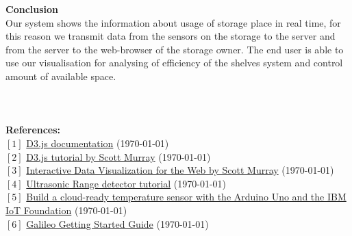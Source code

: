 \documentclass[english]{article}
\begin{document}
\textbf{Conclusion}\\
Our system shows the information about usage of storage place in real time, for this reason we transmit data from the sensors on the storage to the server and from the server to the web-browser of the storage owner. The end user is able to use our visualisation for analysing of efficiency of the shelves system and control amount of available space.
\\\\\\\\

\textbf{References:}\\
$[1]$ \href{http://d3js.org}{D3.js documentation} (\today)\\
$[2]$ \href{http://alignedleft.com/tutorials/d3}{D3.js tutorial by Scott Murray} (\today)\\
$[3]$ \href{http://shop.oreilly.com/product/0636920026938.do?cmp=af-strata-books-videos-product_cj_9781449339739_\%25zp}{Interactive Data Visualization for the Web by Scott Murray} (\today)\\
$[4]$ \href{http://www.instructables.com/id/Ultrasonic-Range-detector-using-Arduino-and-the-SR/}{Ultrasonic Range detector tutorial} (\today)\\
$[5]$ \href{http://www.ibm.com/developerworks/cloud/library/cl-bluemix-arduino-iot1/index.html}{Build a cloud-ready temperature sensor with the Arduino Uno and the IBM IoT Foundation} (\today)\\
$[6]$ \href{https://learn.sparkfun.com/tutorials/galileo-getting-started-guide}{Galileo Getting Started Guide} (\today)\\
\end{document}
